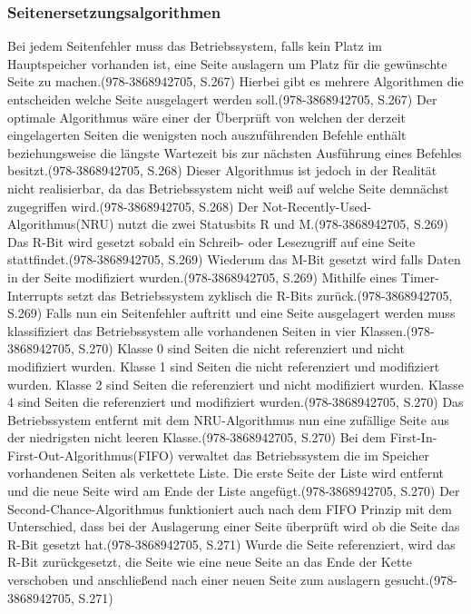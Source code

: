 \subsubsection{Seitenersetzungsalgorithmen}
Bei jedem Seitenfehler muss das Betriebssystem, falls kein Platz im Hauptspeicher vorhanden ist, eine Seite auslagern um Platz für die gewünschte Seite zu machen.(978-3868942705, S.267) Hierbei gibt es mehrere Algorithmen die entscheiden welche Seite ausgelagert werden soll.(978-3868942705, S.267) Der optimale Algorithmus wäre einer der Überprüft von welchen der derzeit eingelagerten Seiten die wenigsten noch auszuführenden Befehle enthält beziehungsweise die längste Wartezeit bis zur nächsten Ausführung eines Befehles besitzt.(978-3868942705, S.268)  Dieser Algorithmus ist jedoch in der Realität nicht realisierbar, da das Betriebssystem nicht weiß auf welche Seite demnächst zugegriffen wird.(978-3868942705, S.268) 
Der Not-Recently-Used-Algorithmus(NRU) nutzt die zwei Statusbits R und M.(978-3868942705, S.269) Das R-Bit wird gesetzt sobald ein Schreib- oder Lesezugriff auf eine Seite stattfindet.(978-3868942705, S.269)  Wiederum das M-Bit gesetzt wird falls Daten in der Seite modifiziert wurden.(978-3868942705, S.269)  Mithilfe eines Timer-Interrupts setzt das Betriebssystem zyklisch die R-Bits zurück.(978-3868942705, S.269) Falls nun ein Seitenfehler auftritt und eine Seite ausgelagert werden muss klassifiziert das Betriebssystem alle vorhandenen Seiten in vier Klassen.(978-3868942705, S.270)  Klasse 0 sind Seiten die nicht referenziert und nicht modifiziert wurden. Klasse 1 sind Seiten die nicht referenziert und modifiziert wurden. Klasse 2 sind Seiten die referenziert und nicht modifiziert wurden. Klasse 4 sind Seiten die referenziert und modifiziert wurden.(978-3868942705, S.270) Das Betriebssystem entfernt mit dem NRU-Algorithmus nun eine zufällige Seite aus der niedrigsten nicht leeren Klasse.(978-3868942705, S.270)
Bei dem First-In-First-Out-Algorithmus(FIFO) verwaltet das Betriebssystem die im Speicher vorhandenen Seiten als verkettete Liste. Die erste Seite der Liste wird entfernt und die neue Seite wird am Ende der Liste angefügt.(978-3868942705, S.270)
Der Second-Chance-Algorithmus funktioniert auch nach dem FIFO Prinzip mit dem Unterschied, dass bei der Auslagerung einer Seite überprüft wird ob die Seite das R-Bit gesetzt hat.(978-3868942705, S.271) Wurde die Seite referenziert, wird das R-Bit zurückgesetzt, die Seite wie eine neue Seite an das Ende der Kette verschoben und anschließend nach einer neuen Seite zum auslagern gesucht.(978-3868942705, S.271)
